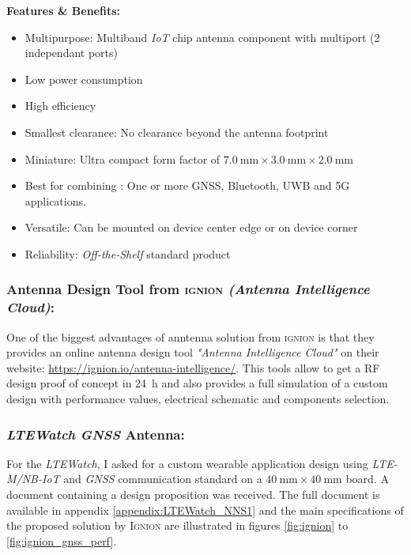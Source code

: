 \documentclass[report.tex]{subfiles}
\begin{document}
\begin{flushleft}
\textbf{Features \& Benefits:}
\end{flushleft}
\begin{itemize}
\item Multipurpose: Multiband \textit{IoT} chip antenna component with multiport (2 independant ports)
\item Low power consumption
\item High efficiency
\item Smallest clearance: No clearance beyond the antenna footprint
\item Miniature: Ultra compact form factor of $\SI{7.0}{\milli\meter} \times \SI{3.0}{\milli\meter} \times \SI{2.0}{\milli\meter}$
\item Best for combining : One or more GNSS, Bluetooth, UWB and 5G applications.
\item Versatile: Can be mounted on device center edge or on device corner
\item Reliability: \textit{Off-the-Shelf} standard product
\end{itemize}

\subsubsection{Antenna Design Tool from \textsc{ignion} \textit{(Antenna Intelligence Cloud)}:}

One of the biggest advantages of anntenna solution from \textsc{ignion} is that they provides an online antenna design tool \textit{"Antenna Intelligence Cloud"} on their website: \url{https://ignion.io/antenna-intelligence/}. This tools allow to get a RF design proof of concept in \SI{24}{\hour} and also provides a full simulation of a custom design with performance values, electrical schematic and components selection.

\subsubsection{\textit{LTEWatch} \textit{GNSS} Antenna:}

For the \textit{LTEWatch}, I asked for a custom wearable application design using \textit{LTE-M/NB-IoT} and \textit{GNSS} communication standard on a $\SI{40}{\milli\meter} \times \SI{40}{\milli\meter}$ board. A document containing a design proposition was received. The full document is available in appendix \ref{appendix:LTEWatch_NNS1} and the main specifications of the proposed solution by \textsc{Ignion} are illustrated in figures \ref{fig:ignion}
to \ref{fig:ignion_gnss_perf}.\\
\end{document}

